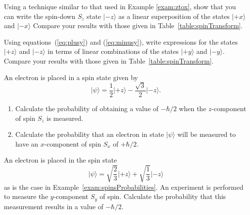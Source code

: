 \begin{problem}
  Using a technique similar to that used in Example \ref{exam:ztox},
  show that you can write the spin-down $S_z$ state
  $\vert\mbox{$-z$}\rangle$ as a linear superposition of the states
  $\vert\mbox{$+x$}\rangle$ and $\vert\mbox{$-x$}\rangle$ Compare your
  results with those given in Table~\ref{table:spinTransform}.
\end{problem}

\begin{problem}
Using equations~(\ref{eq:plusy}) and (\ref{eq:minusy}), write expressions for the states $\vert\mbox{$+z$}\rangle$ and $\vert\mbox{$-z$}\rangle$ in terms of linear combinations of the states $\vert\mbox{$+y$}\rangle$ and $\vert\mbox{$-y$}\rangle$.  Compare your results with those given in Table~\ref{table:spinTransform}.
\end{problem}

\begin{problem}
An electron is placed in a spin state given by
\[ \vert\mbox{$\psi$}\rangle = \frac{1}{2}\vert\mbox{$+z$}\rangle -\frac{\sqrt{3}}{2}\vert\mbox{$-z$}\rangle .\]
\begin{enumerate}
\item Calculate the probability of obtaining a value of $-\hbar/2$ when the $z$-component of spin $S_z$ is measured.
\item Calculate the probability that an electron in state $\vert\mbox{$\psi$}\rangle$ will be measured to have an $x$-component of spin $S_x$ of $+\hbar/2$.
\end{enumerate}
\label{prob:ElectronSpinState}
\end{problem}

\begin{problem}
An electron is placed in the spin state
\[ \vert\mbox{$\psi$}\rangle = \sqrt{\frac{2}{3}}\vert\mbox{$+z$}\rangle +\sqrt{\frac{1}{3}}\vert\mbox{$-z$}\rangle \]
as is the case in Example~\ref{exam:spinsProbabilities}. An experiment is performed to measure the $y$-component $S_y$ of spin.  Calculate the probability that this measurement results in a value of $-\hbar/2$.
\label{prob:ElectronSpinState2}
\end{problem}

